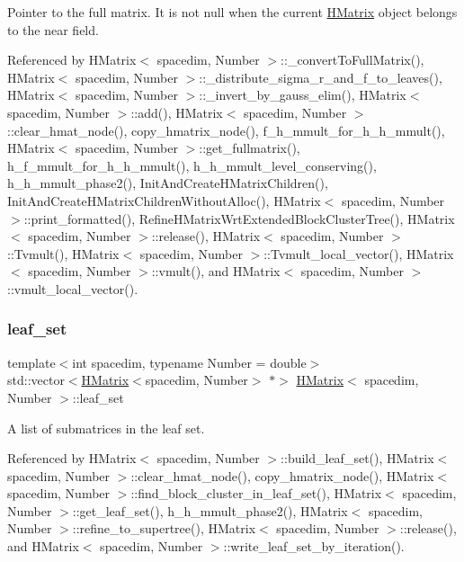 Pointer to the full matrix. It is not null when the current \hyperlink{classHMatrix}{H\+Matrix} object belongs to the near field. 

Referenced by H\+Matrix$<$ spacedim, Number $>$\+::\+\_\+convert\+To\+Full\+Matrix(), H\+Matrix$<$ spacedim, Number $>$\+::\+\_\+distribute\+\_\+sigma\+\_\+r\+\_\+and\+\_\+f\+\_\+to\+\_\+leaves(), H\+Matrix$<$ spacedim, Number $>$\+::\+\_\+invert\+\_\+by\+\_\+gauss\+\_\+elim(), H\+Matrix$<$ spacedim, Number $>$\+::add(), H\+Matrix$<$ spacedim, Number $>$\+::clear\+\_\+hmat\+\_\+node(), copy\+\_\+hmatrix\+\_\+node(), f\+\_\+h\+\_\+mmult\+\_\+for\+\_\+h\+\_\+h\+\_\+mmult(), H\+Matrix$<$ spacedim, Number $>$\+::get\+\_\+fullmatrix(), h\+\_\+f\+\_\+mmult\+\_\+for\+\_\+h\+\_\+h\+\_\+mmult(), h\+\_\+h\+\_\+mmult\+\_\+level\+\_\+conserving(), h\+\_\+h\+\_\+mmult\+\_\+phase2(), Init\+And\+Create\+H\+Matrix\+Children(), Init\+And\+Create\+H\+Matrix\+Children\+Without\+Alloc(), H\+Matrix$<$ spacedim, Number $>$\+::print\+\_\+formatted(), Refine\+H\+Matrix\+Wrt\+Extended\+Block\+Cluster\+Tree(), H\+Matrix$<$ spacedim, Number $>$\+::release(), H\+Matrix$<$ spacedim, Number $>$\+::\+Tvmult(), H\+Matrix$<$ spacedim, Number $>$\+::\+Tvmult\+\_\+local\+\_\+vector(), H\+Matrix$<$ spacedim, Number $>$\+::vmult(), and H\+Matrix$<$ spacedim, Number $>$\+::vmult\+\_\+local\+\_\+vector().

\mbox{\label{classHMatrix_a61dbd471077be0ad8325d0f2afe3d43f}} 
\subsubsection{\texorpdfstring{leaf\+\_\+set}{leaf\_set}}
{\footnotesize\ttfamily template$<$int spacedim, typename Number = double$>$ \\
std\+::vector$<$\hyperlink{classHMatrix}{H\+Matrix}$<$spacedim, Number$>$ $\ast$$>$ \hyperlink{classHMatrix}{H\+Matrix}$<$ spacedim, Number $>$\+::leaf\+\_\+set\hspace{0.3cm}{\ttfamily [private]}}

A list of submatrices in the leaf set. 

Referenced by H\+Matrix$<$ spacedim, Number $>$\+::build\+\_\+leaf\+\_\+set(), H\+Matrix$<$ spacedim, Number $>$\+::clear\+\_\+hmat\+\_\+node(), copy\+\_\+hmatrix\+\_\+node(), H\+Matrix$<$ spacedim, Number $>$\+::find\+\_\+block\+\_\+cluster\+\_\+in\+\_\+leaf\+\_\+set(), H\+Matrix$<$ spacedim, Number $>$\+::get\+\_\+leaf\+\_\+set(), h\+\_\+h\+\_\+mmult\+\_\+phase2(), H\+Matrix$<$ spacedim, Number $>$\+::refine\+\_\+to\+\_\+supertree(), H\+Matrix$<$ spacedim, Number $>$\+::release(), and H\+Matrix$<$ spacedim, Number $>$\+::write\+\_\+leaf\+\_\+set\+\_\+by\+\_\+iteration().

